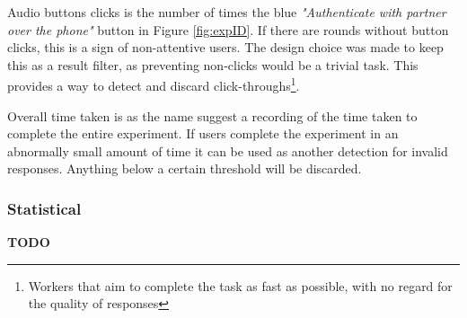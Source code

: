 Audio buttons clicks is the number of times the blue \textit{"Authenticate with partner over the phone"} button in Figure \ref{fig:expID}. If there are rounds without button clicks, this is a sign of non-attentive users. The design choice was made to keep this as a result filter, as preventing non-clicks would be a trivial task. This provides a way to detect and discard click-throughs\footnote{Workers that aim to complete the task as fast as possible, with no regard for the quality of responses}. 

Overall time taken is as the name suggest a recording of the time taken to complete the entire experiment. If users complete the experiment in an abnormally small amount of time it can be used as another detection for invalid responses. Anything below a certain threshold will be discarded.

\subsubsection{Statistical}
\textbf{TODO}